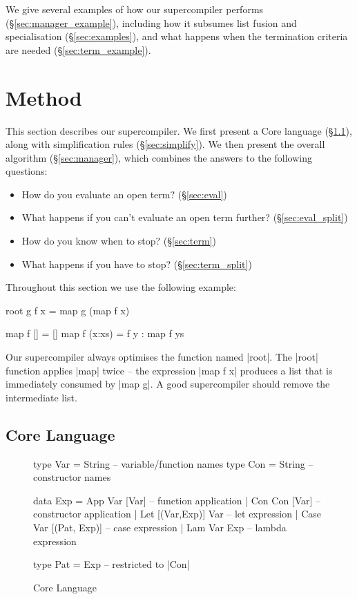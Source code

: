 \documentclass[draft]{sigplanconf}
\begin{document}
We give several examples of how our supercompiler performs (\S\ref{sec:manager_example}), including how it subsumes list fusion and specialisation (\S\ref{sec:examples}), and what happens when the termination criteria are needed (\S\ref{sec:term_example}).

\section{Method}
\label{sec:method}

This section describes our supercompiler. We first present a Core language (\S\ref{sec:core}), along with simplification rules (\S\ref{sec:simplify}). We then present the overall algorithm (\S\ref{sec:manager}), which combines the answers to the following questions:

\begin{itemize}
\item How do you evaluate an open term? (\S\ref{sec:eval})
\item What happens if you can't evaluate an open term further? (\S\ref{sec:eval_split})
\item How do you know when to stop? (\S\ref{sec:term})
\item What happens if you have to stop? (\S\ref{sec:term_split})
\end{itemize}

\noindent Throughout this section we use the following example:

\begin{code}
root g f x = map g (map f x)

map f []      = []
map f (x:xs)  = f y : map f ys
\end{code}

Our supercompiler always optimises the function named |root|. The |root| function applies |map| twice -- the expression |map f x| produces a list that is immediately consumed by |map g|. A good supercompiler should remove the intermediate list.

\subsection{Core Language}
\label{sec:core}

\begin{figure}
\begin{code}
type Var   =   String -- variable/function names
type Con   =   String -- constructor names

data Exp   =   App Var [Var]           -- function application
           |   Con Con [Var]           -- constructor application
           |   Let [(Var,Exp)] Var     -- let expression
           |   Case Var [(Pat, Exp)]   -- case expression
           |   Lam Var Exp             -- lambda expression

type Pat   =   Exp -- restricted to |Con|
\end{code}
\caption{Core Language}
\label{fig:core}
\end{figure}
\end{document}
